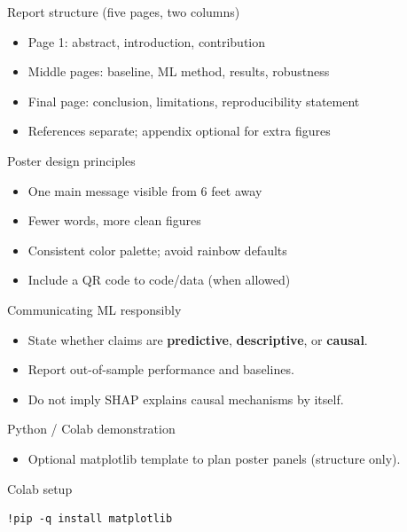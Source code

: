 \documentclass[aspectratio=169,11pt]{beamer}
\begin{document}
\begin{frame}{Report structure (five pages, two columns)}
  \begin{itemize}
    \item Page 1: abstract, introduction, contribution
    \item Middle pages: baseline, ML method, results, robustness
    \item Final page: conclusion, limitations, reproducibility statement
    \item References separate; appendix optional for extra figures
  \end{itemize}
\end{frame}

\begin{frame}{Poster design principles}
  \begin{itemize}
    \item One main message visible from 6 feet away
    \item Fewer words, more clean figures
    \item Consistent color palette; avoid rainbow defaults
    \item Include a QR code to code/data (when allowed)
  \end{itemize}
\end{frame}

\begin{frame}{Communicating ML responsibly}
  \begin{itemize}
    \item State whether claims are \textbf{predictive}, \textbf{descriptive}, or \textbf{causal}.
    \item Report out-of-sample performance and baselines.
    \item Do not imply SHAP explains causal mechanisms by itself.
  \end{itemize}
\end{frame}

\begin{frame}{Python / Colab demonstration}
  \begin{itemize}
    \item Optional matplotlib template to plan poster panels (structure only).
  \end{itemize}
\end{frame}

\begin{frame}[fragile]{Colab setup}
  \begin{verbatim}
!pip -q install matplotlib
  \end{verbatim}
\end{frame}
\end{document}
